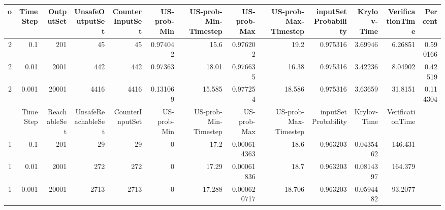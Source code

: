 

\begin{tabular}{rrrrrrrrrrrrr}
\hline
   o &   TimeStep &   OutputSet &   UnsafeOutputSet &   CounterInputSet &   US-prob-Min &   US-prob-Min-Timestep &   US-prob-Max &   US-prob-Max-Timestep &   inputSet Probability &   Krylov-Time &   VerificationTime &   Percent \\
\hline
   2 &      0.1   &         201 &                45 &                45 &      0.974042 &                 15.6   &      0.976202 &                 19.2   &               0.975316 &       3.69946 &            6.26851 &  0.590166 \\
   2 &      0.01  &        2001 &               442 &               442 &      0.97363  &                 18.01  &      0.976635 &                 16.38  &               0.975316 &       3.42236 &            8.04902 &  0.42519  \\
   2 &      0.001 &       20001 &              4416 &              4416 &      0.131069 &                 15.585 &      0.977254 &                 18.586 &               0.975316 &       3.63659 &           31.8151  &  0.114304 \\
\hline

\begin{tabular}{rrrrrrrrrrrr}
\hline
   o &   TimeStep &   ReachableSet &   UnsafeReachableSet &   CounterInputSet &   US-prob-Min &   US-prob-Min-Timestep &   US-prob-Max &   US-prob-Max-Timestep &   inputSet Probability &   Krylov-Time &   VerificationTime \\
\hline
   1 &      0.1   &            201 &                   29 &                29 &             0 &                 17.2   &   0.000614363 &                 18.6   &               0.963203 &     0.0435462 &           146.431  \\
   1 &      0.01  &           2001 &                  272 &               272 &             0 &                 17.29  &   0.00061836  &                 18.7   &               0.963203 &     0.0814397 &           164.379  \\
   1 &      0.001 &          20001 &                 2713 &              2713 &             0 &                 17.288 &   0.000620717 &                 18.706 &               0.963203 &     0.0594482 &            93.2077 \\
\hline
\end{tabular}
